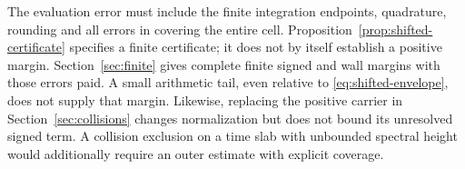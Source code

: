 The evaluation error must include the finite integration endpoints,
quadrature, rounding and all errors in covering the entire cell.
Proposition~\ref{prop:shifted-certificate} specifies a finite certificate;
it does not by itself establish a positive margin. Section~\ref{sec:finite}
gives complete finite signed and wall margins with those errors paid. A small arithmetic
tail, even relative to \eqref{eq:shifted-envelope}, does not supply that
margin. Likewise, replacing the positive carrier in
Section~\ref{sec:collisions} changes normalization but does not bound its
unresolved signed term. A collision exclusion on a time slab with unbounded
spectral height would additionally require an outer estimate with explicit
coverage.
